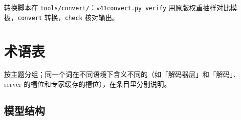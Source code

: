 \documentclass[11pt,a4paper]{article}
\newcommand{\code}[1]{\texttt{#1}}
\begin{document}
转换脚本在 \code{tools/convert/}：\code{v41convert.py verify} 用原版权重抽样对比模板，\code{convert} 转换，\code{check} 核对输出。

\clearpage
\section{术语表}
\label{sec:glossary}

按主题分组；同一个词在不同语境下含义不同的（如「解码器层」和「解码」、server 的槽位和专家缓存的槽位），在条目里分别说明。


\subsection*{模型结构}
\end{document}
